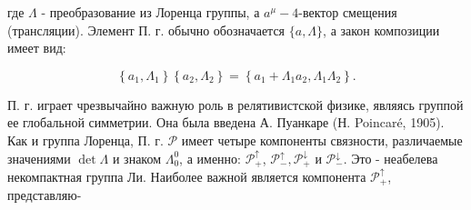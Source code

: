 \documentclass[10pt]{article}
\begin{document}
где $\Lambda$ - преобразование из Лоренца группы, а $a^{\mu}-4$-вектор смещения (трансляции). Элемент П. г. обычно обозначается $\{a, \Lambda\}$, а закон композиции имеет вид:



\[

\left\{a_{1}, \Lambda_{1}\right\}\left\{a_{2}, \Lambda_{2}\right\}=\left\{a_{1}+\Lambda_{1} a_{2}, \Lambda_{1} \Lambda_{2}\right\} .

\]



П. г. играет чрезвычайно важную роль в релятивистской физике, являясь группой ее глобальной симметрии. Она была введена А. Пуанкаре (Н. Poincaré, 1905). Как и группа Лоренца, П. г. $\mathscr{P}$ имеет четыре компоненты связности, различаемые значениями $\operatorname{det} \Lambda$ и знаком $\Lambda_{0}^{0}$, а именно: $\mathscr{P}_{+}^{\uparrow}$, $\mathscr{P}_{-}^{\uparrow}, \mathscr{P}_{+}^{\downarrow}$ и $\mathscr{P}_{-}^{\downarrow}$. Это - неабелева некомпактная группа Ли. Наиболее важной является компонента $\mathscr{P}_{+}^{\uparrow}$, представляю-
\end{document}
